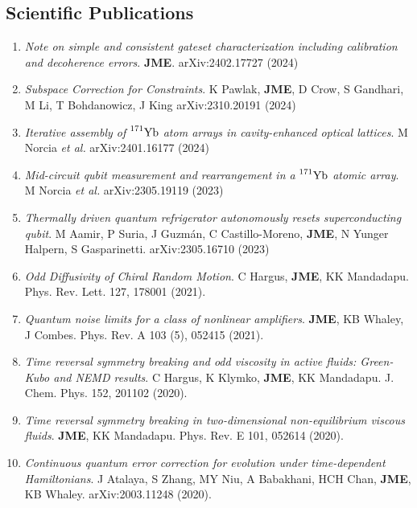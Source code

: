 \documentclass[]{article}
\begin{document}
\subsection*{Scientific Publications}
\begin{enumerate}

\item \textit{Note on simple and consistent gateset characterization including calibration and decoherence errors}. \textbf{JME}. arXiv:2402.17727 (2024)
	
\item \textit{Subspace Correction for Constraints}. K Pawlak, \textbf{JME}, D Crow, S Gandhari, M Li, T Bohdanowicz, J King arXiv:2310.20191 (2024)

\item \textit{Iterative assembly of} $\prescript{171}{}{\textrm{Yb}}$ \textit{atom arrays in cavity-enhanced optical lattices}. M Norcia \textit{et al.} arXiv:2401.16177 (2024)

\item \textit{Mid-circuit qubit measurement and rearrangement in a} $\prescript{171}{}{\textrm{Yb}}$ \textit{atomic array}. M Norcia \textit{et al.} arXiv:2305.19119 (2023)

\item \textit{Thermally driven quantum refrigerator autonomously resets superconducting qubit}.
M Aamir, P Suria, J Guzmán, C Castillo-Moreno, \textbf{JME}, N Yunger Halpern, S Gasparinetti. arXiv:2305.16710 (2023)
	
\item \textit{Odd Diffusivity of Chiral Random Motion}. C Hargus, \textbf{JME}, KK Mandadapu. Phys. Rev. Lett. 127, 178001 (2021).

\item\textit{Quantum noise limits for a class of nonlinear amplifiers}. \textbf{JME}, KB Whaley, J Combes. Phys. Rev. A 103 (5), 052415 (2021).

\item \textit{Time reversal symmetry breaking and odd viscosity in active fluids: Green-Kubo and NEMD results}. C Hargus, K Klymko, \textbf{JME}, KK Mandadapu.  J. Chem. Phys. 152, 201102 (2020).

\item \textit{Time reversal symmetry breaking in two-dimensional non-equilibrium viscous fluids}. \textbf{JME}, KK Mandadapu. Phys. Rev. E 101, 052614 (2020).

\item \textit{Continuous quantum error correction for evolution under time-dependent Hamiltonians}. J Atalaya, S Zhang, MY Niu, A Babakhani, HCH Chan, \textbf{JME}, KB Whaley. 	arXiv:2003.11248 (2020).


\end{enumerate}
\end{document}
